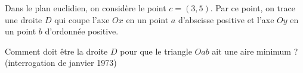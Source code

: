 \begin{exercice}\label{exoGeneral0015}

	Dans le plan euclidien, on considère le point $c=(3,5)$. Par ce point, on trace une droite $D$ qui coupe l'axe $Ox$ en un point $a$ d'abscisse positive et l'axe $Oy$ en un point $b$ d'ordonnée positive.

	Comment doit être la droite $D$ pour que le triangle $Oab$ ait une aire minimum ? (interrogation de janvier 1973)

\end{exercice}
